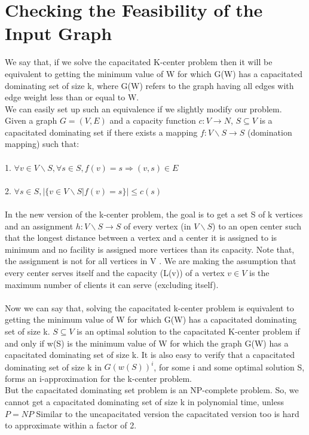 \documentclass[12pt,a4paper,onecolumn]{article}
\begin{document}
\section{Checking the Feasibility of the Input Graph}
We say that, if we solve the capacitated K-center problem then it will be equivalent to getting the minimum value of W for which G(W) has a capacitated dominating set of size k, where G(W) refers to the graph having all edges with edge weight less than or equal to W.\\
We can easily set up such an equivalence if we slightly modify our problem. Given a graph $G = (V,E)$ and a capacity function $c : V \rightarrow N$, $S \subseteq V$ is a capacitated dominating set if there exists a mapping $f : V \backslash S \rightarrow S$ (domination mapping) such that:\\\\ 1. $\forall v \in V \backslash S,\forall s \in S,f(v) = s \Longrightarrow (v,s) \in E$\\ \\2. $\forall s \in S,| \{ v \in V \backslash S | f(v) = s \} | \leq c(s)$\\ \\In the new version of the k-center problem, the goal is to get a set S of k vertices and an assignment $h : V \backslash S \rightarrow S$ of every vertex (in $V \backslash S$) to an open center such that the longest distance between a vertex and a center it is assigned to is minimum and no facility is assigned more vertices than its capacity. Note that, the assignment is not for all vertices in V . We are making the assumption that every center serves itself and the capacity (L(v)) of a vertex $v \in V$ is the maximum number of clients it can serve (excluding itself). \\\\Now we can say that, solving the capacitated k-center problem is equivalent to getting the minimum value of W for which G(W) has a capacitated dominating set of size k. 
$S \subseteq V$ is an optimal solution to the capacitated K-center problem if and only if w(S) is the minimum value of W for which the graph G(W) has a capacitated dominating set of size k.
It is also easy to verify that a capacitated dominating set of size k in $G(w(S))^i$, for some i and some optimal solution S, forms an i-approximation for the k-center problem.\\ But the capacitated dominating set problem is an NP-complete problem. So, we cannot get a capacitated dominating set of size k in polynomial time, unless $P = NP$ Similar to the uncapacitated version the capacitated version too is hard to approximate within a factor of 2.
\end{document}
